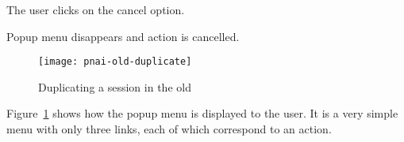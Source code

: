 \begin{center}
\begin{usecase}
{\begin{usecasepath}[c]
        \setcounter{enumi}{4}
        \item The user clicks on the cancel option.
        \item Popup menu disappears and action is cancelled.
      \end{usecasepath}
    }
  \end{usecase}
\end{center}

\begin{figure}[htbp]
  \centering
    \texttt{[image: pnai-old-duplicate]}
  \caption{Duplicating a session in the old }
  \label{fig:pnai-old-duplicate}
\end{figure}

Figure~\ref{fig:pnai-old-duplicate} shows how the popup menu is displayed to the user.
It is a very simple menu with only three links, each of which correspond to an action.
